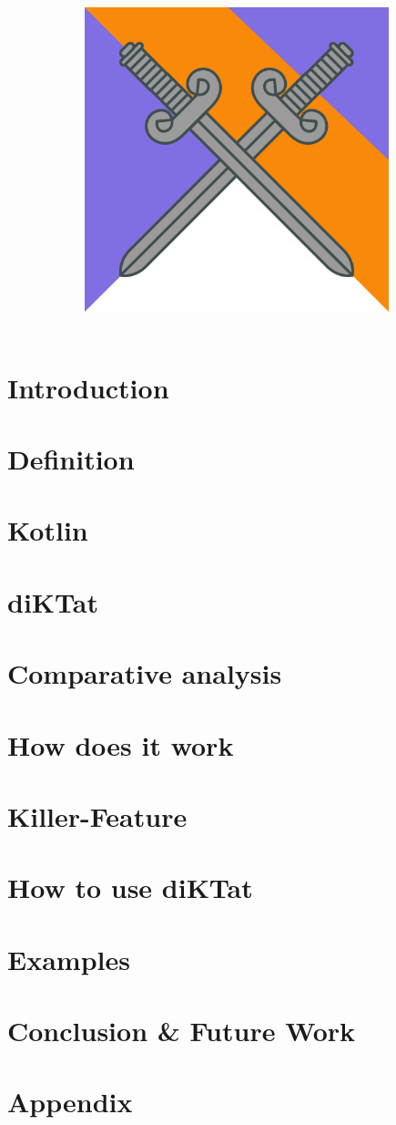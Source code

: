 \documentclass{article}
\title{
  \includegraphics[height=250pt]{pictures/logo.png}\\
  }
\begin{document}
\author{}
\maketitle

\pagebreak
\renewcommand{\cftsecleader}{\cftdotfill{\cftdotsep}}
\tableofcontents
\pagebreak

\section{Introduction}
\label{sec:intro}


\section{Definition}
\label{sec:definition}


\section{Kotlin}
\label{sec:kotlin}


\section{diKTat}
\label{sec:diKTat}


\section{Comparative analysis}
\label{sec:compare}


\section{How does it work}
\label{sec:work}


\section{Killer-Feature}
\label{sec:feature}


\section{How to use diKTat}
\label{sec:download}


\section{Examples}
\label{sec:examples}


\section{Conclusion \& Future Work}
\label{sec:conclusion}


\newpage
\nocite{*}



\newpage
\section{Appendix}
\label{sec:appendix}

\end{document}
